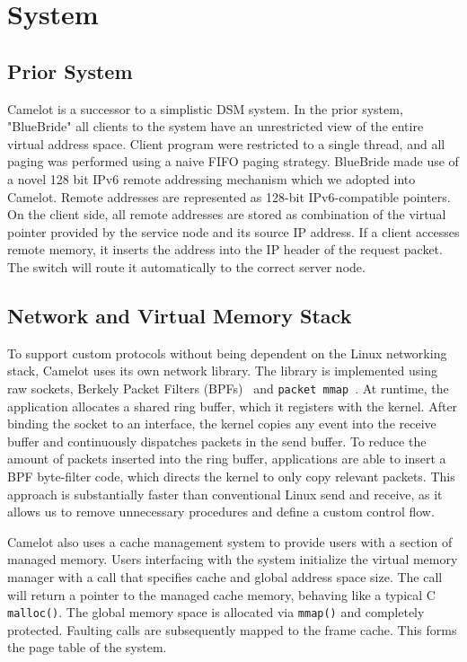 \section{System}
\label{sec:system}
\subsection{Prior System} Camelot is a successor to a
simplistic DSM system. In the prior system, "BlueBride" all clients to the
system have an unrestricted view of the entire virtual address space.
Client program were restricted to a single thread, and all paging was
performed using a naive FIFO paging strategy. BlueBride made use of a
novel 128 bit IPv6 remote addressing mechanism which we adopted into
Camelot. Remote addresses are represented as 128-bit IPv6-compatible
pointers. On the client side, all remote addresses are stored as
combination of the virtual pointer provided by the service node and
its source IP address. If a client accesses remote memory, it inserts
the address into the IP header of the request packet. The switch will
route it automatically to the correct server node.

\subsection{Network and Virtual Memory Stack}
To support custom protocols without being dependent on the Linux networking stack, Camelot uses its own network library. The library is implemented using raw sockets, Berkely Packet Filters (BPFs)~\cite{bpf} and \texttt{packet mmap}~\cite{packet_mmap}.
At runtime, the application allocates a shared ring buffer, which it registers with the kernel.  After binding the socket to an interface, the kernel copies any event into the receive buffer and continuously dispatches packets in the send buffer. To reduce the amount of packets inserted into the ring buffer, applications are able to insert a BPF byte-filter code, which directs the kernel to only copy relevant packets. This approach is substantially faster than conventional Linux send and receive, as it allows us to remove unnecessary procedures and define a custom control flow.

Camelot also uses a cache management system to provide users with a section of managed memory. Users interfacing with the system initialize the virtual memory manager with a call that specifies cache and global address space size. The call will return a pointer to the managed cache memory, behaving like a typical C \texttt{malloc()}. The global memory space is allocated via \texttt{mmap()} and completely protected. Faulting calls are subsequently mapped to the frame cache. This forms the page table of the system. 

